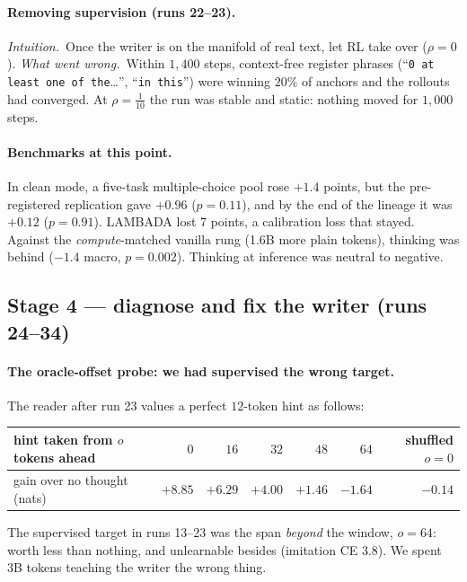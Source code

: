 \documentclass[11pt]{article}
\newcommand{\why}{\emph{Intuition.}\ }
\newcommand{\fail}{\emph{What went wrong.}\ }
\begin{document}
\paragraph{Removing supervision (runs 22--23).}
\why Once the writer is on the manifold of real text, let RL take over ($\rho=0$).
\fail Within $1{,}400$ steps, context-free register phrases (``\texttt{0 at least one of the}\ldots'', ``\texttt{in this}'') were winning $20\%$ of anchors and the rollouts had converged. At $\rho=\tfrac1{10}$ the run was stable and static: nothing moved for $1{,}000$ steps.

\paragraph{Benchmarks at this point.}
In clean mode, a five-task multiple-choice pool rose $+1.4$ points, but the pre-registered replication gave $+0.96$ ($p=0.11$), and by the end of the lineage it was $+0.12$ ($p=0.91$). LAMBADA lost 7 points, a calibration loss that stayed. Against the \emph{compute}-matched vanilla rung (1.6B more plain tokens), thinking was behind ($-1.4$ macro, $p=0.002$). Thinking at inference was neutral to negative.

\subsection*{Stage 4 --- diagnose and fix the writer (runs 24--34)}

\paragraph{The oracle-offset probe: we had supervised the wrong target.}
The reader after run 23 values a perfect $12$-token hint as follows:
\begin{center}\small
\begin{tabular}{lrrrrrr}
\toprule
hint taken from $o$ tokens ahead & $0$ & $16$ & $32$ & $48$ & $64$ & shuffled $o{=}0$\\
\midrule
gain over no thought (nats) & $+8.85$ & $+6.29$ & $+4.00$ & $+1.46$ & $\mathbf{-1.64}$ & $-0.14$\\
\bottomrule
\end{tabular}
\end{center}
The supervised target in runs 13--23 was the span \emph{beyond} the window, $o=64$: worth less than nothing, and unlearnable besides (imitation CE $3.8$). We spent 3B tokens teaching the writer the wrong thing.
\end{document}
